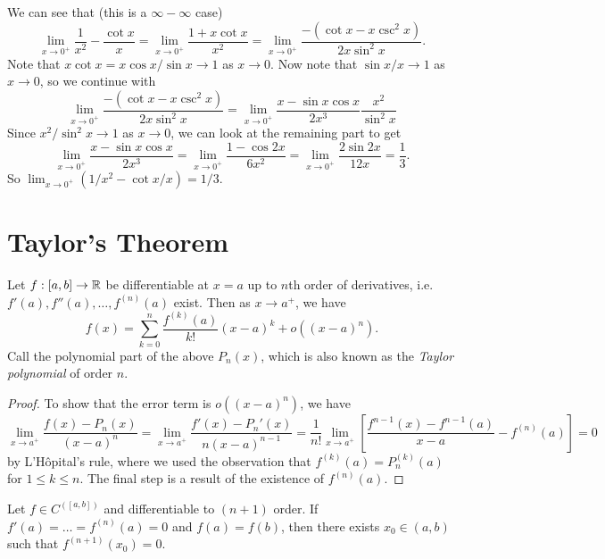 \begin{example}
  We can see that (this is a $\infty - \infty$ case)
  \[
    \lim_{x \to 0^+} \frac{1}{x^2} - \frac{\cot x}{x}
    = \lim_{x \to 0^+} \frac{1 + x \cot x}{x^2}
    = \lim_{x \to 0^+} \frac{-(\cot x - x \csc^2 x)}{2x \sin^2 x}.
  \]
  Note that $x \cot x = x \cos x / \sin x \to 1$ as
  $x \to 0$. Now note that $\sin x / x \to 1$ as $x \to 0$,
  so we continue with
  \[
    \lim_{x \to 0^+} \frac{-(\cot x - x \csc^2 x)}{2x \sin^2 x}
    = \lim_{x \to 0^+} \frac{x - \sin x \cos x}{2x^3} \frac{x^2}{\sin^2 x}
  \]
  Since $x^2 / \sin^2 x \to 1$ as $x \to 0$, we can
  look at the remaining part to get
  \[
    \lim_{x \to 0^+} \frac{x - \sin x \cos x}{2x^3}
    = \lim_{x \to 0^+} \frac{1 - \cos 2x}{6x^2}
    = \lim_{x \to 0^+} \frac{2 \sin 2x}{12x} = \frac{1}{3}.
  \]
  So $\lim_{x \to 0^+} (1 / x^2 - \cot x / x) = 1 / 3$.
\end{example}

\section{Taylor's Theorem}
\begin{theorem}
  Let $f : [a, b] \to \mathbb{R}$ be differentiable at $x = a$
  up to $n$th order of derivatives, i.e.
  $f'(a), f''(a), \dots, f^{(n)}(a)$ exist. Then as
  $x \to a^+$, we have
  \[f(x) = \sum_{k = 0}^n \frac{f^{(k)}(a)}{k!}(x - a)^k + o((x - a)^n).\]
  Call the polynomial part of the above $P_n(x)$, which
  is also known as the \emph{Taylor polynomial} of order $n$.
\end{theorem}

\begin{proof}
  To show that the error term is $o((x - a)^n)$, we have
  \[
    \lim_{x \to a^+} \frac{f(x) - P_n(x)}{(x - a)^n}
    = \lim_{x \to a^+} \frac{f'(x) - P_n'(x)}{n(x - a)^{n - 1}}
    = \frac{1}{n!} \lim_{x \to a^+} \left[\frac{f^{n - 1}(x) - f^{n - 1}(a)}{x - a} - f^{(n)}(a)\right] = 0
  \]
  by L'H\^opital's rule, where we used the observation
  that
  $f^{(k)}(a) = P_n^{(k)}(a)$ for $1 \le k \le n$.
  The final step is a result of the existence of $f^{(n)}(a)$.
\end{proof}

\begin{lemma}
  Let $f \in C^([a, b])$ and differentiable to
  $(n + 1)$ order. If $f'(a) = \dots = f^{(n)}(a) = 0$
  and $f(a) = f(b)$, then there exists $x_0 \in (a, b)$
  such that $f^{(n + 1)}(x_0) = 0$.
\end{lemma}

